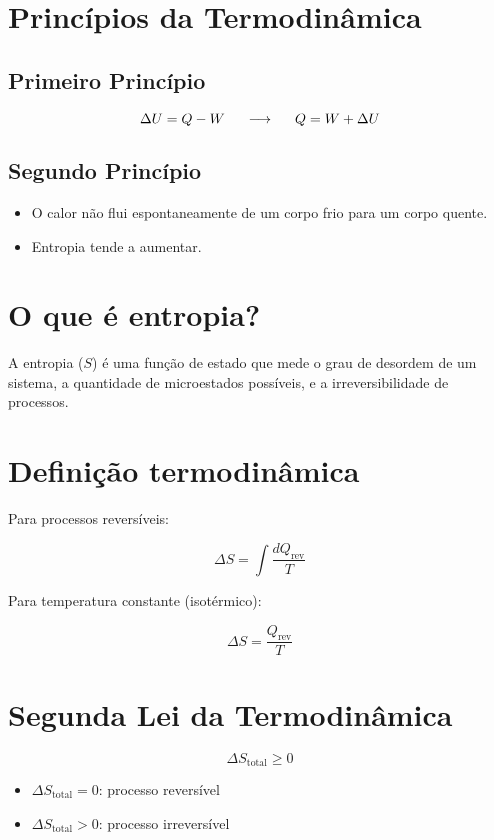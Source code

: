 \documentclass[a4paper,12pt]{article}
\begin{document}
\begin{multicols}{2}
\section{Princ\'ipios da Termodinâmica}

\subsection{Primeiro Princípio}
\begin{equation}
    \Delta U = Q - W   \hspace{0.5cm} \longrightarrow \hspace{0.5cm} Q = W + \Delta U
\end{equation}
\subsection{Segundo Princípio}
\begin{itemize}
    \item O calor não flui espontaneamente de um corpo frio para um corpo quente.
    \item Entropia tende a aumentar.
\end{itemize}

\section*{O que é entropia?}
A entropia (\(S\)) é uma função de estado que mede o grau de desordem de um sistema, a quantidade de microestados possíveis, e a irreversibilidade de processos.

\section*{Definição termodinâmica}
Para processos reversíveis:

\[
\Delta S = \int \frac{dQ_{\text{rev}}}{T}
\]

Para temperatura constante (isotérmico):

\[
\Delta S = \frac{Q_{\text{rev}}}{T}
\]

\section*{Segunda Lei da Termodinâmica}

\[
\Delta S_{\text{total}} \geq 0
\]

\begin{itemize}
  \item \( \Delta S_{\text{total}} = 0 \): processo reversível
  \item \( \Delta S_{\text{total}} > 0 \): processo irreversível
\end{itemize}


\end{multicols}
\end{document}
